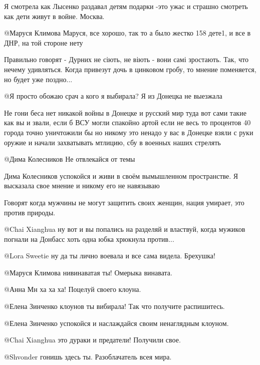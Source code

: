\begin{itemize}
Я смотрела как Лысенко раздавал детям подарки -это ужас и страшно смотреть как
дети живут в войне. Москва.

@Маруся Климова  Маруся, все хорошо, так то а было жестко 158 дете1, и все в
ДНР, на той стороне нету


Правильно говорят - Дурних не  сіють, не віють - вони самі зростають. Так, что
нечему удивляться. Когда привезут дочь в цинковом гробу, то мнение поменяется,
но будет уже поздно...

 @Я просто обожаю срач  а кого я выбирала? Я из Донецка  не выезжала


Не гони беса нет никакой войны в Донецке и русский мир туда вот сами такие как
вы и звали, если б ВСУ могли спакойно артой если не весь то процентов 40
города точно уничтожили бы но никому это ненадо у вас в Донецке взяли с руки
оружие и начали захватывать мтлицию, сбу в военных наших стрелять 

 @Дима Колесников  Не отвлекайся от темы

Дима Колесников успокойся и живи в своём вымышленном пространстве. Я высказала свое  мнение  и никому его не навязываю


Говорят когда мужчины не могут защитить своих женщин, нация умирает, это против природы.

 @Chai Xianghua  ну вот и вы попались на разделяй и властвуй, когда мужиков
 погнали на Донбасс хоть одна юбка хрюкнула против...


 @Lora Sweetie  ну да ты лично воевала и все сама видела. Брехушка! 

 @Маруся Климова  нивинаватая ты! Омерыка винавата.

 @Анна Мн  ха ха ха! Поцелуй своего клоуна.

 @Елена Зинченко  клоунов ты вибирала!  Так что получите распишитесь.

 @Елена Зинченко  успокойся и наслаждайся своим ненаглядным клоуном.

 @Chai Xianghua  это дураки и предатели! Получили свое.

 @Shvonder  гонишь здесь ты. Разоблачатель всея мира. 


\end{itemize}

